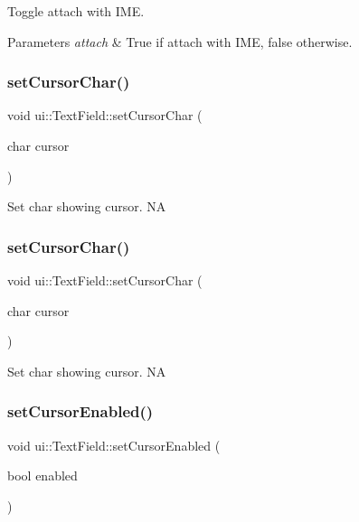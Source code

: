 Toggle attach with I\+ME. 


\begin{DoxyParams}{Parameters}
{\em attach} & True if attach with I\+ME, false otherwise. \\
\hline
\end{DoxyParams}
\mbox{\label{classui_1_1TextField_a27149c6499b7651ad4f1fca8211fda1e}} 
\subsubsection{\texorpdfstring{set\+Cursor\+Char()}{setCursorChar()}\hspace{0.1cm}{\footnotesize\ttfamily [1/2]}}
{\footnotesize\ttfamily void ui\+::\+Text\+Field\+::set\+Cursor\+Char (\begin{DoxyParamCaption}\item[{char}]{cursor }\end{DoxyParamCaption})}

Set char showing cursor.  NA \mbox{\label{classui_1_1TextField_a27149c6499b7651ad4f1fca8211fda1e}} 
\subsubsection{\texorpdfstring{set\+Cursor\+Char()}{setCursorChar()}\hspace{0.1cm}{\footnotesize\ttfamily [2/2]}}
{\footnotesize\ttfamily void ui\+::\+Text\+Field\+::set\+Cursor\+Char (\begin{DoxyParamCaption}\item[{char}]{cursor }\end{DoxyParamCaption})}

Set char showing cursor.  NA \mbox{\label{classui_1_1TextField_acfbd7a912c166c1de933081466976f15}} 
\subsubsection{\texorpdfstring{set\+Cursor\+Enabled()}{setCursorEnabled()}\hspace{0.1cm}{\footnotesize\ttfamily [1/2]}}
{\footnotesize\ttfamily void ui\+::\+Text\+Field\+::set\+Cursor\+Enabled (\begin{DoxyParamCaption}\item[{bool}]{enabled }\end{DoxyParamCaption})}

